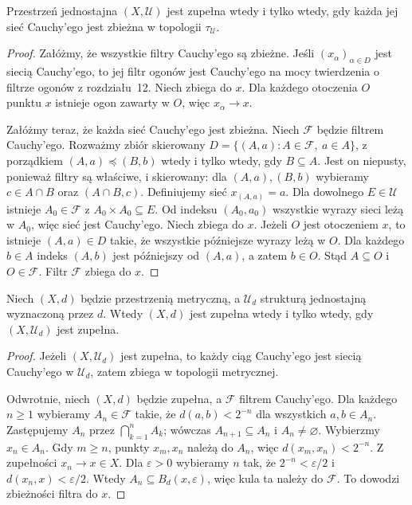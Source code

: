 \begin{twierdzenie}
\label{thm:topog-uzupelnienia-filtry-sieci}
Przestrzeń jednostajna $(X,\mathcal U)$ jest zupełna
wtedy i tylko wtedy, gdy każda jej sieć Cauchy'ego
jest zbieżna w topologii $\tau_{\mathcal U}$.
\end{twierdzenie}
\begin{proof}
Załóżmy, że wszystkie filtry Cauchy'ego są zbieżne.
Jeśli $(x_\alpha)_{\alpha\in D}$ jest siecią Cauchy'ego,
to jej filtr ogonów jest Cauchy'ego na mocy
twierdzenia o filtrze ogonów z rozdziału~12.
Niech zbiega do $x$. Dla każdego otoczenia $O$
punktu $x$ istnieje ogon zawarty w $O$,
więc $x_\alpha\to x$.

Załóżmy teraz, że każda sieć Cauchy'ego jest zbieżna.
Niech $\mathcal F$ będzie filtrem Cauchy'ego.
Rozważmy zbiór skierowany
$D=\{(A,a):A\in\mathcal F,\ a\in A\}$,
z porządkiem $(A,a)\preceq(B,b)$ wtedy i tylko wtedy,
gdy $B\subseteq A$. Jest on niepusty, ponieważ
filtry są właściwe, i skierowany: dla
$(A,a),(B,b)$ wybieramy $c\in A\cap B$
oraz $(A\cap B,c)$. Definiujemy sieć
$x_{(A,a)}=a$.
Dla dowolnego $E\in\mathcal U$ istnieje
$A_0\in\mathcal F$ z $A_0\times A_0\subseteq E$.
Od indeksu $(A_0,a_0)$ wszystkie wyrazy
sieci leżą w $A_0$, więc sieć jest Cauchy'ego.
Niech zbiega do $x$.
Jeżeli $O$ jest otoczeniem $x$, to istnieje
$(A,a)\in D$ takie, że wszystkie późniejsze
wyrazy leżą w $O$. Dla każdego $b\in A$
indeks $(A,b)$ jest późniejszy od $(A,a)$,
a zatem $b\in O$. Stąd $A\subseteq O$
i $O\in\mathcal F$. Filtr $\mathcal F$ zbiega do $x$.
\end{proof}

\begin{stwierdzenie}
\label{prop:topog-uzupelnienia-metryczna}
Niech $(X,d)$ będzie przestrzenią metryczną,
a $\mathcal U_d$ strukturą jednostajną wyznaczoną
przez $d$. Wtedy $(X,d)$ jest zupełna wtedy
i tylko wtedy, gdy $(X,\mathcal U_d)$ jest zupełna.
\end{stwierdzenie}
\begin{proof}
Jeżeli $(X,\mathcal U_d)$ jest zupełna, to
każdy ciąg Cauchy'ego jest siecią Cauchy'ego
w $\mathcal U_d$, zatem zbiega w topologii metrycznej.

Odwrotnie, niech $(X,d)$ będzie zupełna, a
$\mathcal F$ filtrem Cauchy'ego. Dla każdego
$n\ge1$ wybieramy $A_n\in\mathcal F$ takie, że
$d(a,b)<2^{-n}$ dla wszystkich $a,b\in A_n$.
Zastępujemy $A_n$ przez $\bigcap_{k=1}^n A_k$;
wówczas $A_{n+1}\subseteq A_n$ i $A_n\ne\varnothing$.
Wybierzmy $x_n\in A_n$. Gdy $m\ge n$,
punkty $x_m,x_n$ należą do $A_n$,
więc $d(x_m,x_n)<2^{-n}$.
Z zupełności $x_n\to x\in X$.
Dla $\varepsilon>0$ wybieramy $n$ tak,
że $2^{-n}<\varepsilon/2$ i
$d(x_n,x)<\varepsilon/2$.
Wtedy $A_n\subseteq B_d(x,\varepsilon)$,
więc kula ta należy do $\mathcal F$.
To dowodzi zbieżności filtra do $x$.
\end{proof}

